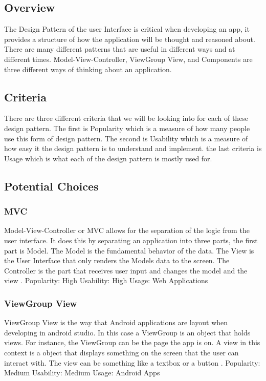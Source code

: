 \documentclass[compsoc, 10, draftclsnofoot, onecolumn]{IEEEtran}
\begin{document}
\subsection{Overview}  The Design Pattern of the user Interface is critical when developing an app, it provides a structure of how the application will be thought and reasoned about. There are many different patterns that are useful in different ways and at different times. Model-View-Controller, ViewGroup View, and Components are three different ways of thinking about an application. 
\subsection{Criteria} There are three different criteria that we will be looking into for each of these design pattern. The first is Popularity which is a measure of how many people use this form of design pattern. The second is Usability which is a measure of how easy it the design pattern is to understand and implement. the last criteria is Usage which is what each of the design pattern is mostly used for.
\subsection{Potential Choices}
\subsubsection{MVC}
Model-View-Controller or MVC allows for the separation of the logic from the user interface. It does this by separating an application into three parts, the first part is Model. The Model is the fundamental behavior of the data. The View is the User Interface that only renders the Models data to the screen. The Controller is the part that receives user input and changes the model and the view \cite{r6}.
\newline
Popularity: High
\newline
Usability: High
\newline
Usage: Web Applications
\newline
\newline
\subsubsection{ViewGroup View}
\indent ViewGroup View is the way that Android applications are layout when developing in android studio. In this case a ViewGroup is an object that holds views. For instance, the ViewGroup can be the page the app is on. A view in this context is a object that displays something on the screen that the user can interact with. The view can be something like a textbox or a button \cite{r4}. 
\newline
Popularity: Medium
\newline
Usability: Medium
\newline
Usage: Android Apps
\newline
\newline
\end{document}
